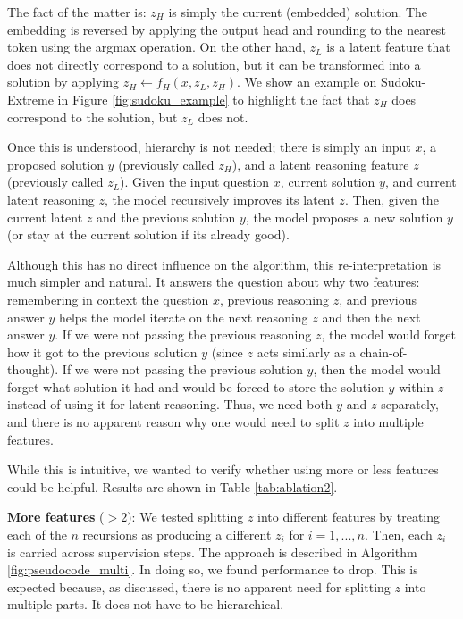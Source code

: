 \documentclass{article}
\theoremstyle{plain}
\theoremstyle{definition}
\theoremstyle{remark}
\begin{document}
The fact of the matter is: $z_H$ is simply the current (embedded) solution. The embedding is reversed by applying the output head and rounding to the nearest token using the argmax operation. On the other hand, $z_L$ is a latent feature that does not directly correspond to a solution, but it can be transformed into a solution by applying $z_H \gets f_H(x,z_L,z_H)$. We show an example on Sudoku-Extreme in Figure \ref{fig:sudoku_example} to highlight the fact that $z_H$ does correspond to the solution, but $z_L$ does not. 

Once this is understood, hierarchy is not needed; there is simply an input $x$, a proposed solution $y$ (previously called $z_H$), and a latent reasoning feature $z$ (previously called $z_L$). Given the input question $x$, current solution $y$, and current latent reasoning $z$, the model recursively improves its latent $z$. Then, given the current latent $z$ and the previous solution $y$, the model proposes a new solution $y$ (or stay at the current solution if its already good). 

Although this has no direct influence on the algorithm, this re-interpretation is much simpler and natural. It answers the question about why two features: remembering in context the question $x$, previous reasoning $z$, and previous answer $y$ helps the model iterate on the next reasoning $z$ and then the next answer $y$. If we were not passing the previous reasoning $z$, the model would forget how it got to the previous solution $y$ (since $z$ acts similarly as a chain-of-thought). If we were not passing the previous solution $y$, then the model would forget what solution it had and would be forced to store the solution $y$ within $z$ instead of using it for latent reasoning. Thus, we need both $y$ and $z$ separately, and there is no apparent reason why one would need to split $z$ into multiple features. \newpage

While this is intuitive, we wanted to verify whether using more or less features could be helpful. Results are shown in Table \ref{tab:ablation2}.

\textbf{More features} ($>2$): We tested splitting $z$ into different features by treating each of the $n$ recursions as producing a different $z_i$ for $i=1,...,n$. Then, each $z_i$ is carried across supervision steps. The approach is described in Algorithm \ref{fig:pseudocode_multi}. In doing so, we found performance to drop. This is expected because, as discussed, there is no apparent need for splitting $z$ into multiple parts. It does not have to be hierarchical.
\end{document}
